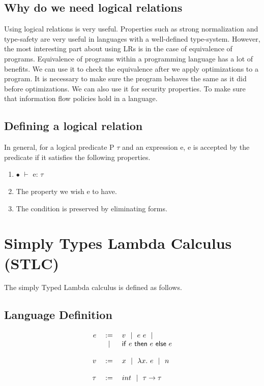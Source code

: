 \documentclass[10pt]{article}
\begin{document}
 \subsection{Why do we need logical relations}
 Using logical relations is very useful. Properties such as strong normalization and type-safety are very useful in languages with a well-defined type-system. However, the most interesting part about using LRs is in the case of equivalence of programs. 
 \newline
 Equivalence of programs within a programming language has a lot of benefits. We can use it to check the equivalence after we apply optimizations to a program. It is necessary to make sure the program behaves the same as it did before optimizations. We can also use it for security properties. To make sure that information flow policies hold in a language. 
 \subsection{Defining a logical relation}
  In general, for a
  logical predicate P $\tau$ and an expression e, e is accepted by the predicate if it satisfies the following properties.
  \begin{enumerate}
  	\item $\bullet$ $\vdash$ e: $\tau$
  	\item The property we wish e to have.
  	\item The condition is preserved by eliminating forms.
  \end{enumerate}
  
  
  \section{Simply Types Lambda Calculus (STLC)}
  The simply Typed Lambda calculus is defined as follows. 
  
  
\subsection{Language Definition}
  
  \[
  \begin{array}{rcl}
  e  &:=&  v \alt e~e \alt \\
  &\alt& \ife{e}{e}{e} \\
  \\ %
  v  &:=&  x \alt \lamdefe{x}{e} \alt n \\
  \\
  \tau  &:=& int \alt \funct{\tau}{\tau}\\
  \end{array}
  \]
  
\end{document}
